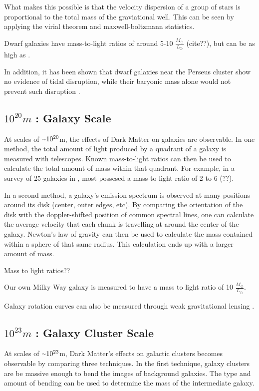     What makes this possible is that the velocity dispersion of a group of stars is proportional to the total mass of the graviational well.
    This can be seen by applying the virial theorem and maxwell-boltzmann statistics.

    Dwarf galaxies have mass-to-light ratios of around 5-10 $\frac{M_\odot}{L_\odot}$ {\color{red}(cite??)}, but can be as high as  \cite{Simon2007_dwarfgalaxykeck}.
    
    In addition, it has been shown that dwarf galaxies near the Perseus cluster show no evidence of tidal disruption, while their baryonic mass alone would not prevent such disruption \cite{Penny2009}.

  \subsection{$10^{20}m$ : Galaxy Scale}
    At scales of $\nicetilde 10^{20}$m, the effects of Dark Matter on galaxies are observable.
    In one method, the total amount of light produced by a quadrant of a galaxy is measured with telescopes.
    Known mass-to-light ratios can then be used to calculate the total amount of mass within that quadrant.
    For example, in a survey of 25 galaxies in \cite{galaxy_mass_light_ratio}, most possesed a mass-to-light ratio of 2 to 6 {\color{red}(??)}.


    In a second method, a galaxy's emission spectrum is observed at many positions around its disk (center, outer edges, etc).
    By comparing the orientation of the disk with the doppler-shifted position of common spectral lines, one can calculate the average velocity that each chunk is travelling at around the center of the galaxy.
    Newton's law of gravity can then be used to calculate the mass contained within a sphere of that same radius.
    This calculation ends up with a larger amount of mass.

    {\color{red}Mass to light ratios??}

    Our own Milky Way galaxy is measured to have a mass to light ratio of 10 $\frac{M_{\odot}}{L_{\odot}}$.

    Galaxy rotation curves can also be measured through weak gravitational lensing \cite{weak_lensing_2001}.

  \subsection{$10^{23}m$ : Galaxy Cluster Scale}
    At scales of $\nicetilde 10^{23}$m, Dark Matter's effects on galactic clusters becomes observable by comparing three techniques.
    In the first technique, galaxy clusters are be massive enough to bend the images of background galaxies.
    The type and amount of bending can be used to determine the mass of the intermediate galaxy.

